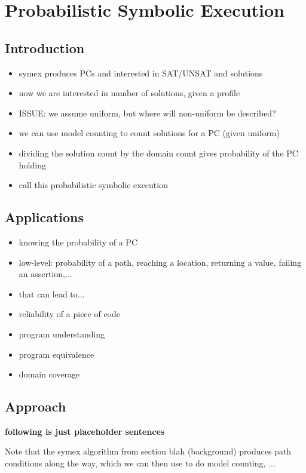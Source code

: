 \section{Probabilistic Symbolic Execution}
\label{sec:pse}

\subsection{Introduction}
\begin{itemize}
\item symex produces PCs and interested in SAT/UNSAT and solutions
\item now we are interested in number of solutions, given a profile
\item ISSUE: we assume uniform, but where will non-uniform be described?
\item we can use model counting to count solutions for a PC (given uniform)
\item dividing the solution count by the domain count gives probability of the PC holding
\item call this probabilistic symbolic execution
\end{itemize}

\subsection{Applications}

\begin{itemize}
\item knowing the probability of a PC
\item low-level: probability of a path, reaching a location, returning a value, failing an assertion,... 
\item that can lead to...
\item reliability of a piece of code
\item program understanding
\item program equivalence
\item domain coverage
\end{itemize}

\subsection{Approach}

{\bf following is just placeholder sentences}

Note that the symex algorithm from section blah (background) produces path conditions along the way, which we can then use to do model counting, ...

